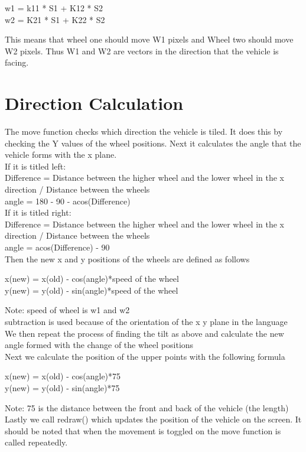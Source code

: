 \documentclass{article}
\begin{document}
\begin{center}
w1 = k11 * S1 + K12 * S2 \\
w2 = K21 * S1 + K22 *  S2
\end{center}

This means that wheel one should move W1 pixels and Wheel two should move W2 pixels. Thus W1 and W2 are vectors in the direction that the vehicle is facing.

\section*{Direction Calculation}

The move function checks which direction the vehicle is tiled. It does this by checking the Y values of the wheel positions. Next it calculates the angle that the vehicle forms with the x plane. \\
If it is titled left:\\

Difference = Distance between the higher wheel and the lower wheel in the x direction / Distance between the wheels \\
angle = 180 - 90 - acos(Difference)\\


If it is titled right:\\

Difference = Distance between the higher wheel and the lower wheel in the x direction / Distance between the wheels\\
angle = acos(Difference) - 90\\

Then the new x and y positions of the wheels are defined as follows
\begin{center}
x(new) = x(old) - cos(angle)*speed of the wheel\\
y(new) = y(old) - sin(angle)*speed of the wheel\\
\end{center}

Note: speed of wheel is w1 and w2\\
    subtraction is used because of the orientation of the x y plane in the language\\
    
We then repeat the process of finding the tilt as above and calculate the new angle formed with the change of the wheel positions\\

Next we calculate the position of the upper points with the following formula

\begin{center}
x(new) = x(old) - cos(angle)*75\\
y(new) = y(old) - sin(angle)*75\\
\end{center}

Note: 75 is the distance between the front and back of the vehicle (the length)\\
    
Lastly we call redraw() which updates the position of the vehicle on the screen. It should be noted that when the movement is toggled on the move function is called repeatedly. 
\end{document}
